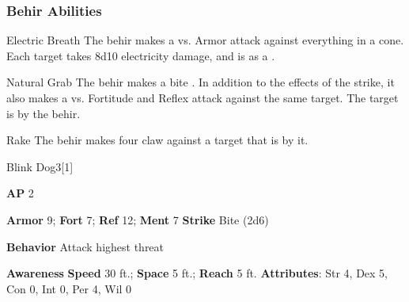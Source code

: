 \subsubsection{Behir Abilities}

\begin{freeability}{Electric Breath}
The behir makes a  vs. Armor attack against everything in a \areamed cone.
\hit Each target takes 8d10 electricity damage, and is  as a .
\end{freeability}

\vspace{0.5em}
\begin{freeability}{Natural Grab}
The behir makes a bite .
In addition to the effects of the strike, it also makes a  vs. Fortitude and Reflex attack against the same target.
\hit The target is  by the behir.
\end{freeability}

\vspace{0.5em}
\begin{apability}{Rake}
The behir makes four claw  against a target that is  by it.
\end{apability}

\begin{monsection}{Blink Dog}{3}[1]
\vspace{-1em}\vspace{-1em}
\begin{spellcontent}
\begin{spelltargetinginfo}
{\textbf{AP} 2}

\pari \textbf{Armor} 9;
\textbf{Fort} 7;
\textbf{Ref} 12;
\textbf{Ment} 7
\pari \textbf{Strike} Bite  (2d6)



\pari \textbf{Behavior} Attack highest threat
\end{spelltargetinginfo}
\end{spellcontent}

\begin{monsterfooter}
\pari \textbf{Awareness} 
\pari \textbf{Speed} 30 ft.;
\textbf{Space} 5 ft.;
\textbf{Reach} 5 ft.
\pari \textbf{Attributes}:
Str 4,
Dex 5,
Con 0,
Int 0,
Per 4,
Wil 0
\end{monsterfooter}
\end{monsection}


